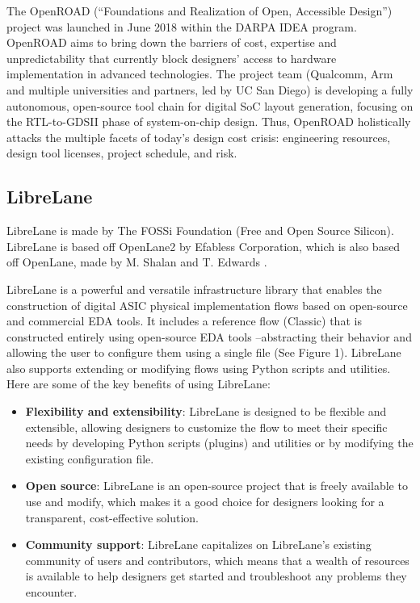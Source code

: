 The OpenROAD (“Foundations and Realization of Open, Accessible Design”) project was launched in June 2018 within the DARPA IDEA program. OpenROAD aims to bring down the barriers of cost, expertise and unpredictability that currently block designers' access to hardware implementation in advanced technologies. The project team (Qualcomm, Arm and multiple universities and partners, led by UC San Diego) is developing a fully autonomous, open-source tool chain for digital SoC layout generation, focusing on the RTL-to-GDSII phase of system-on-chip design. Thus, OpenROAD holistically attacks the multiple facets of today's design cost crisis: engineering resources, design tool licenses, project schedule, and risk.

\subsection{LibreLane}
LibreLane is made by The FOSSi Foundation (Free and Open Source Silicon). LibreLane is based off OpenLane2 by Efabless Corporation, which is also based off OpenLane, made by M. Shalan and T. Edwards \cite{openlane-2020}.

LibreLane is a powerful and versatile infrastructure library that enables the construction of digital ASIC physical implementation flows based on open-source and commercial EDA tools. It includes a reference flow (Classic) that is constructed entirely using open-source EDA tools –abstracting their behavior and allowing the user to configure them using a single file (See Figure 1). LibreLane also supports extending or modifying flows using Python scripts and utilities. Here are some of the key benefits of using LibreLane:

\begin{itemize}
    \item \textbf{Flexibility and extensibility}: LibreLane is designed to be flexible and extensible, allowing designers to customize the flow to meet their specific needs by developing Python scripts (plugins) and utilities or by modifying the existing configuration file.
    \item \textbf{Open source}: LibreLane is an open-source project that is freely available to use and modify, which makes it a good choice for designers looking for a transparent, cost-effective solution.
    \item \textbf{Community support}: LibreLane capitalizes on LibreLane's existing community of users and contributors, which means that a wealth of resources is available to help designers get started and troubleshoot any problems they encounter.
\end{itemize}

